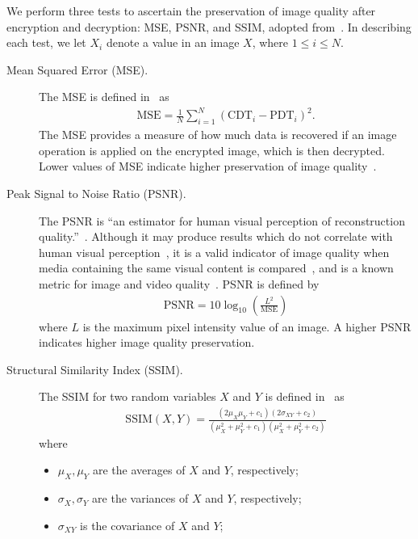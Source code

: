 We perform three tests to ascertain the preservation of image quality after encryption and decryption: MSE, PSNR, and SSIM, adopted from~\cite{ahmed_benchmark_2016, ahmad_efficiency_2012, wu_npcr_2011}. In describing each test, we let $X_i$ denote a value in an image $X$, where $1 \leq i \leq N$.
\begin{description}
	\item [Mean Squared Error (MSE).] The MSE is defined in~\cite{ahmed_benchmark_2016} as
	\begin{align}
        \mathrm{MSE} = \frac{1}{N}\sum_{i=1}^{N}{(\mathrm{CDT}_i - \mathrm{PDT}_i)^2}.
	\end{align}
	The MSE provides a measure of how much data is recovered if an image operation is applied on the encrypted image, which is then decrypted. Lower values of MSE indicate higher preservation of image quality~\cite{ahmed_benchmark_2016, ahmad_efficiency_2012}.
	\item [Peak Signal to Noise Ratio (PSNR).]
	The PSNR is ``an estimator for human visual perception of reconstruction quality.''~\cite{ahmed_benchmark_2016}. Although it may produce results which do not correlate with human visual perception~\cite{huynh-thu_accuracy_2012, ahmed_benchmark_2016}, it is a valid indicator of image quality when media containing the same visual content is compared~\cite{huynh-thu_accuracy_2012}, and is a known metric for image and video quality~\cite{upmanyu_efficient_2009, jain_image_2016, akramullah_video_2014}.
	PSNR is defined by
	\begin{align}
        \mathrm{PSNR} = 10\log_{10}{\left( \frac{L^2}{\mathrm{MSE}} \right)}
	\end{align}
	where $L$ is the maximum pixel intensity value of an image. A higher PSNR indicates higher image quality preservation.
	\item [Structural Similarity Index (SSIM).]
	The SSIM for two random variables $X$ and $Y$ is defined in~\cite{ahmed_benchmark_2016, akramullah_video_2014} as
	\begin{align}
        \mathrm{SSIM}(X,Y) = \frac{(2\mu_X\mu_Y+c_1)(2\sigma_{XY}+c_2)}{(\mu_X^2+\mu_Y^2+c_1)(\mu_X^2+\mu_Y^2+c_2)}
	\end{align}
	where
	\begin{itemize}
		\item $\mu_X, \mu_Y$ are the averages of $X$ and $Y$, respectively;
		\item $\sigma_X, \sigma_Y$ are the variances of $X$ and $Y$, respectively;
		\item $\sigma_{XY}$ is the covariance of $X$ and $Y$;

\end{itemize}
\end{description}
